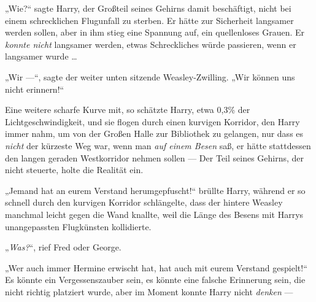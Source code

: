 „Wie?“ sagte Harry, der Großteil seines Gehirns damit beschäftigt, nicht bei einem schrecklichen Flugunfall zu sterben. Er hätte zur Sicherheit langsamer werden sollen, aber in ihm stieg eine Spannung auf, ein quellenloses Grauen. Er \emph{konnte nicht} langsamer werden, etwas Schreckliches würde passieren, wenn er langsamer wurde …

„Wir —“, sagte der weiter unten sitzende Weasley-Zwilling.
„Wir können uns nicht erinnern!“

Eine weitere scharfe Kurve mit, so schätzte Harry, etwa 0,3\% der Lichtgeschwindigkeit, und sie flogen durch einen kurvigen Korridor, den Harry immer nahm, um von der Großen Halle zur Bibliothek zu gelangen, nur dass es \emph{nicht} der kürzeste Weg war, wenn man \emph{auf einem Besen} saß, er hätte stattdessen den langen geraden Westkorridor nehmen sollen —
Der Teil seines Gehirns, der nicht steuerte, holte die Realität ein.

„Jemand hat an eurem Verstand herumgepfuscht!“ brüllte Harry, während er so schnell durch den kurvigen Korridor schlängelte, dass der hintere Weasley manchmal leicht gegen die Wand knallte, weil die Länge des Besens mit Harrys unangepassten Flugkünsten kollidierte.

„\emph{Was?}“, rief Fred oder George.

„Wer auch immer Hermine erwischt hat, hat auch mit eurem Verstand gespielt!“ Es könnte ein Vergessenszauber sein, es könnte eine falsche Erinnerung sein, die nicht richtig platziert wurde, aber im Moment konnte Harry nicht \emph{denken} —

